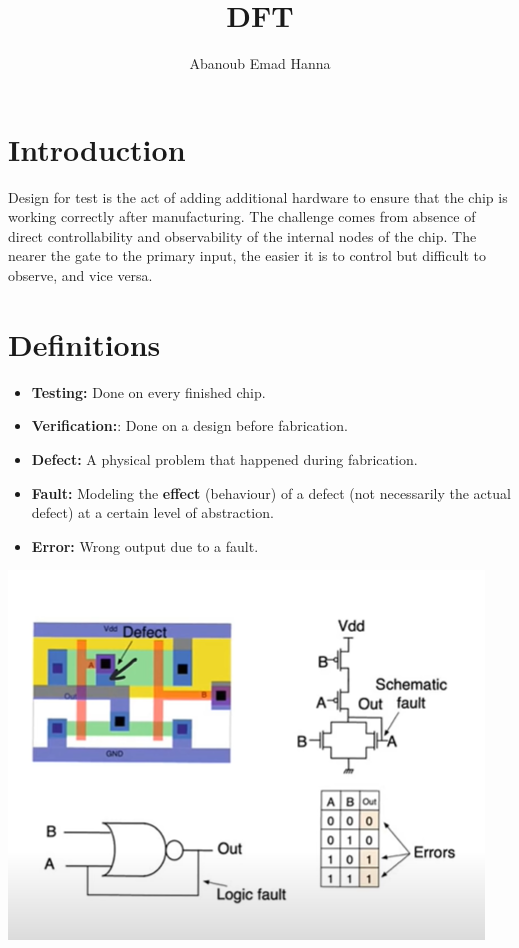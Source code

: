 \documentclass[11pt]{article}
\title{DFT}
\author{Abanoub Emad Hanna}
\date{}
\begin{document}
\maketitle

\section*{Introduction}
Design for test is the act of adding additional hardware to ensure that the chip is working correctly after manufacturing. The challenge comes from absence of direct controllability and observability of the internal nodes of the chip. The nearer the gate to the primary input, the easier it is to control but difficult to observe, and vice versa.

\section*{Definitions}

\begin{minipage}{0.5\linewidth}
    \begin{itemize}
        \item \textbf{Testing:} Done on every finished chip.
        \item \textbf{Verification:}: Done on a design before fabrication.
        \item \textbf{Defect:} A physical problem that happened during fabrication.
        \item \textbf{Fault:} Modeling the \textbf{effect} (behaviour) of a defect (not necessarily the actual defect)  at a certain level of abstraction.
        \item \textbf{Error:} Wrong output due to a fault.
    \end{itemize}
\end{minipage}
\hfill
\begin{minipage}{0.45\linewidth}
    \begin{center}
        \includegraphics[scale=0.7]{1.png}
    \end{center}
\end{minipage}
\end{document}
